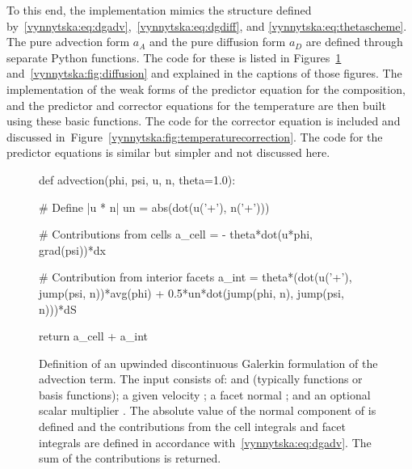 To this end, the implementation mimics the structure defined
by~\eqref{vynnytska:eq:dgadv},~\eqref{vynnytska:eq:dgdiff}, and
\eqref{vynnytska:eq:thetascheme}. The pure advection form $a_A$ and
the pure diffusion form $a_D$ are defined through separate Python
functions. The code for these is listed in
Figures~\ref{vynnytska:fig:advection}
and~\ref{vynnytska:fig:diffusion} and explained in the captions of
those figures. The implementation of the weak forms of the predictor
equation for the composition, and the predictor and corrector
equations for the temperature are then built using these basic functions. The
code for the corrector equation is included and discussed
in~Figure~\ref{vynnytska:fig:temperaturecorrection}. The code for the
predictor equations is similar but simpler and not discussed
here.
\begin{figure}
  \begin{center}
    \begin{python}
def advection(phi, psi, u, n, theta=1.0):

    # Define |u * n|
    un = abs(dot(u('+'), n('+')))

    # Contributions from cells
    a_cell = - theta*dot(u*phi, grad(psi))*dx

    # Contribution from interior facets
    a_int = theta*(dot(u('+'), jump(psi, n))*avg(phi)
                   + 0.5*un*dot(jump(phi, n), jump(psi, n)))*dS

    return a_cell + a_int
    \end{python}
    \caption{Definition of an upwinded discontinuous Galerkin
      formulation of the advection term. The input consists of:
       and  (typically functions or basis
      functions); a given velocity ; a facet normal ;
      and an optional scalar multiplier . The absolute
      value of the normal component of  is defined and the
      contributions from the cell integrals and facet integrals are
      defined in accordance with~\eqref{vynnytska:eq:dgadv}. The sum
      of the contributions is returned.}
  \end{center}
  \label{vynnytska:fig:advection}
\end{figure}
%
